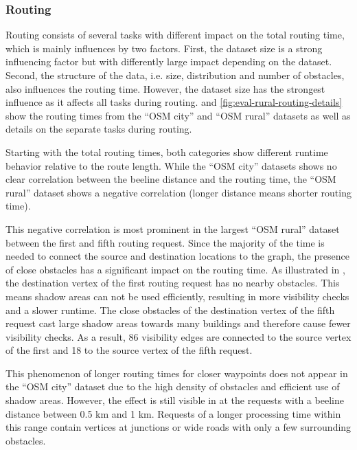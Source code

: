 		\subsubsection{Routing}
		
			Routing consists of several tasks with different impact on the total routing time, which is mainly influences by two factors.
			First, the dataset size is a strong influencing factor but with differently large impact depending on the dataset.
			Second, the structure of the data, i.e. size, distribution and number of obstacles, also influences the routing time.
			However, the dataset size has the strongest influence as it affects all tasks during routing.
			 and \ref{fig:eval-rural-routing-details} show the routing times from the \enquote{OSM city} and \enquote{OSM rural} datasets as well as details on the separate tasks during routing.
			
			Starting with the total routing times, both categories show different runtime behavior relative to the route length.
			While the \enquote{OSM city} datasets shows no clear correlation between the beeline distance and the routing time, the \enquote{OSM rural} dataset shows a negative correlation (longer distance means shorter routing time).
			
			This negative correlation is most prominent in the largest \enquote{OSM rural} dataset between the first and fifth routing request.
			Since the majority of the time is needed to connect the source and destination locations to the graph, the presence of close obstacles has a significant impact on the routing time.
			As illustrated in , the destination vertex of the first routing request has no nearby obstacles.
			This means shadow areas can not be used efficiently, resulting in more visibility checks and a slower runtime.
			The close obstacles of the destination vertex of the fifth request cast large shadow areas towards many buildings and therefore cause fewer visibility checks.
			As a result, 86 visibility edges are connected to the source vertex of the first and 18 to the source vertex of the fifth request.
			
			This phenomenon of longer routing times for closer waypoints does not appear in the \enquote{OSM city} dataset due to the high density of obstacles and efficient use of shadow areas.
			However, the effect is still visible in  at the requests with a beeline distance between 0.5 km and 1 km.
			Requests of a longer processing time within this range contain vertices at junctions or wide roads with only a few surrounding obstacles.
			
